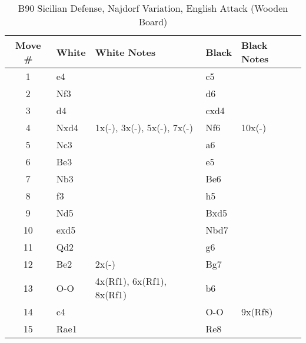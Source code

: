 \begin{table}[htbp]
\centering
\scriptsize
\caption{B90 Sicilian Defense, Najdorf Variation, English Attack (Wooden Board)}
\begin{tabular}{|c|l|p{5cm}|l|p{5cm}|}
\hline
\textbf{Move \#} & \textbf{White} & \textbf{White Notes} & \textbf{Black} & \textbf{Black Notes} \\
\hline
1  & e4    &                     & c5    &                        \\
2  & Nf3   &                     & d6    &                        \\
3  & d4    &                     & cxd4  &                        \\
4  & Nxd4  & 1x(-), 3x(-), 5x(-), 7x(-) & Nf6   & 10x(-)                 \\
5  & Nc3   &                     & a6    &                        \\
6  & Be3   &                     & e5    &                        \\
7  & Nb3   &                     & Be6   &                        \\
8  & f3    &                     & h5    &                        \\
9  & Nd5   &                     & Bxd5  &                        \\
10 & exd5  &                     & Nbd7  &                        \\
11 & Qd2   &                     & g6    &                        \\
12 & Be2   & 2x(-)               & Bg7   &                        \\
13 & O-O   & 4x(Rf1), 6x(Rf1), 8x(Rf1) & b6    &                        \\
14 & c4    &                     & O-O   & 9x(Rf8)                  \\
15 & Rae1  &                     & Re8   &                        \\
\hline
\end{tabular}
\end{table}

